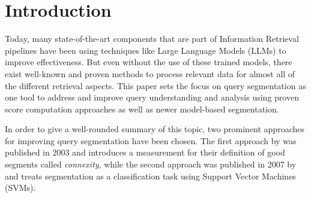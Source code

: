 \section{Introduction} \label{introduction}
Today, many state-of-the-art components that are part of Information Retrieval pipelines have been using techniques like Large Language Models (LLMs) to improve effectiveness. But even without the use of these trained models, there exist well-known and proven methods to process relevant data for almost all of the different retrieval aspects. This paper sets the focus on query segmentation as one tool to address and improve query understanding and analysis using proven score computation approaches as well as newer model-based segmentation. 

In order to give a well-rounded summary of this topic, two prominent approaches for improving query segmentation have been chosen. The first approach by \citet{Risvik:2003} was published in 2003 and introduces a measurement for their definition of good segments called \textit{connexity}, while the second approach was published in 2007 by \citet{Bergsma:2007} and treats segmentation as a classification task using Support Vector Machines (SVMs).